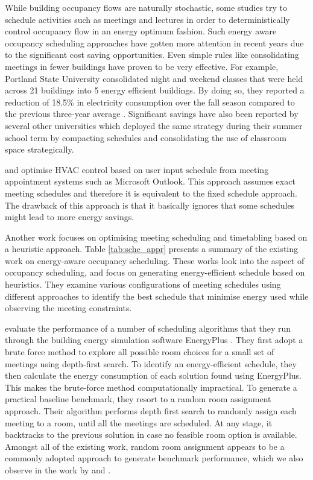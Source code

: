 While building occupancy flows are naturally stochastic, some studies try to schedule activities such as meetings and lectures in order to deterministically control occupancy flow in an energy optimum fashion. Such energy aware occupancy scheduling approaches have gotten more attention in recent years due to the significant cost saving opportunities. Even simple rules like consolidating meetings in fewer buildings have proven to be very effective. For example, Portland State University consolidated night and weekend classes that were held across 21 buildings into 5 energy efficient buildings. By doing so, they reported a reduction of 18.5\% in electricity consumption over the fall season compared to the previous three-year average \citep{portland:2012}. Significant savings have also been reported by several other universities \citep{msu:2009,ncu:2015,iowa:2015} which deployed the same strategy during their summer school term by compacting schedules and consolidating the use of classroom space strategically.

\cite{balaji2013zonepac} and \cite{capehart2007web} optimise HVAC control based on user input schedule from meeting appointment systems such as Microsoft Outlook. This approach assumes exact meeting schedules and therefore it is equivalent to the fixed schedule approach. The drawback of this approach is that it basically ignores that some schedules might lead to more energy savings.

Another work focuses on optimising meeting scheduling and timetabling based on a heuristic approach. Table \ref{tab:sche_appr} presents a summary of the existing work on energy-aware occupancy scheduling. These works look into the aspect of occupancy scheduling, and focus on generating energy-efficient schedule based on heuristics. They examine various configurations of meeting schedules using different approaches to identify the best schedule that minimise energy used while observing the meeting constraints.

\cite{majumdar2012energy} evaluate the performance of a number of scheduling algorithms that they run through the building energy simulation software EnergyPlus \citep{crawley2000energyplus}. They first adopt a brute force method to explore all possible room choices for a small set of meetings using depth-first search. To identify an energy-efficient schedule, they then calculate the energy consumption of each solution found using EnergyPlus. This makes the brute-force method computationally impractical. To generate a practical baseline benchmark, they resort to a random room assignment approach. Their algorithm performs depth first search to randomly assign each meeting to a room, until all the meetings are scheduled. At any stage, it backtracks to the previous solution in case no feasible room option is available. Amongst all of the existing work, random room assignment appears to be a commonly adopted approach to generate benchmark performance, which we also observe in the work by \cite{klein2012coordinating} and \cite{chai2014minimizing}.

